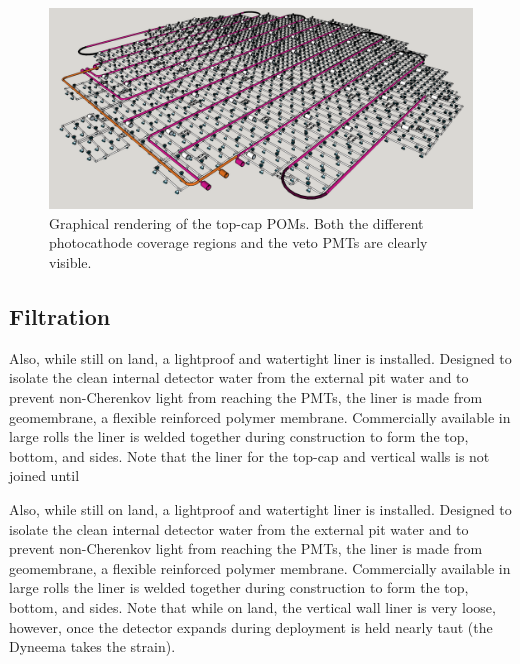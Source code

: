 \begin{figure} %
    \includegraphics[width=\textwidth]{diagrams/4-chips/top_cap.png}
    \caption[Graphical rendering of the top-cap POMs.]
    {Graphical rendering of the top-cap POMs. Both the different photocathode coverage regions and
        the veto PMTs are clearly visible.}
    \label{fig:top_cap}
\end{figure}

\subsection{Filtration} %
\label{sec:chips_detector_water} %

Also, while still on land, a lightproof and watertight liner is installed. Designed to isolate the
clean internal detector water from the external pit water and to prevent non-Cherenkov light from
reaching the PMTs, the liner is made from geomembrane, a flexible reinforced polymer membrane.
Commercially available in large rolls the liner is welded together during construction to form the
top, bottom, and sides. Note that the liner for the top-cap and vertical walls is not joined until

Also, while still on land, a lightproof and watertight liner is installed. Designed to isolate the
clean internal detector water from the external pit water and to prevent non-Cherenkov light from
reaching the PMTs, the liner is made from geomembrane, a flexible reinforced polymer membrane.
Commercially available in large rolls the liner is welded together during construction to form the
top, bottom, and sides. Note that while on land, the vertical wall liner is very loose, however,
once the detector expands during deployment is held nearly taut (the Dyneema takes the strain).

